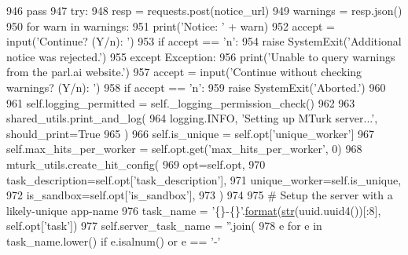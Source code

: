 \begin{DoxyCode}
{{{946                 \textcolor{keywordflow}{pass}
947             \textcolor{keywordflow}{try}:
948                 resp = requests.post(notice\_url)
949                 warnings = resp.json()
950                 \textcolor{keywordflow}{for} warn \textcolor{keywordflow}{in} warnings:
951                     print(\textcolor{stringliteral}{'Notice: '} + warn)
952                     accept = input(\textcolor{stringliteral}{'Continue? (Y/n): '})
953                     \textcolor{keywordflow}{if} accept == \textcolor{stringliteral}{'n'}:
954                         \textcolor{keywordflow}{raise} SystemExit(\textcolor{stringliteral}{'Additional notice was rejected.'})
955             \textcolor{keywordflow}{except} Exception:
956                 print(\textcolor{stringliteral}{'Unable to query warnings from the parl.ai website.'})
957                 accept = input(\textcolor{stringliteral}{'Continue without checking warnings? (Y/n): '})
958                 \textcolor{keywordflow}{if} accept == \textcolor{stringliteral}{'n'}:
959                     \textcolor{keywordflow}{raise} SystemExit(\textcolor{stringliteral}{'Aborted.'})
960 
961         self.logging\_permitted = self.\_logging\_permission\_check()
962 
963         shared\_utils.print\_and\_log(
964             logging.INFO, \textcolor{stringliteral}{'Setting up MTurk server...'}, should\_print=\textcolor{keyword}{True}
965         )
966         self.is\_unique = self.opt[\textcolor{stringliteral}{'unique\_worker'}]
967         self.max\_hits\_per\_worker = self.opt.get(\textcolor{stringliteral}{'max\_hits\_per\_worker'}, 0)
968         mturk\_utils.create\_hit\_config(
969             opt=self.opt,
970             task\_description=self.opt[\textcolor{stringliteral}{'task\_description'}],
971             unique\_worker=self.is\_unique,
972             is\_sandbox=self.opt[\textcolor{stringliteral}{'is\_sandbox'}],
973         )
974 
975         \textcolor{comment}{# Setup the server with a likely-unique app-name}
976         task\_name = \textcolor{stringliteral}{'\{\}-\{\}'}.\hyperlink{namespaceparlai_1_1chat__service_1_1services_1_1messenger_1_1shared__utils_a32e2e2022b824fbaf80c747160b52a76}{format}(\hyperlink{namespacegenerate__task__READMEs_a5b88452ffb87b78c8c85ececebafc09f}{str}(uuid.uuid4())[:8], self.opt[\textcolor{stringliteral}{'task'}])
977         self.server\_task\_name = \textcolor{stringliteral}{''}.join(
978             e \textcolor{keywordflow}{for} e \textcolor{keywordflow}{in} task\_name.lower() \textcolor{keywordflow}{if} e.isalnum() \textcolor{keywordflow}{or} e == \textcolor{stringliteral}{'-'}
}}}
\end{DoxyCode}
